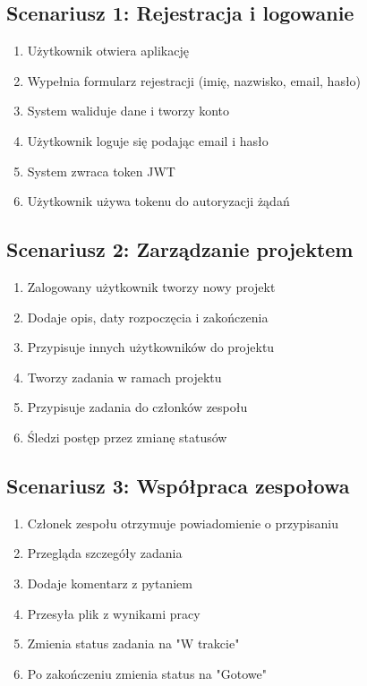 \documentclass[12pt,a4paper]{report}
\begin{document}
\subsection{Scenariusz 1: Rejestracja i logowanie}

\begin{enumerate}
    \item Użytkownik otwiera aplikację
    \item Wypełnia formularz rejestracji (imię, nazwisko, email, hasło)
    \item System waliduje dane i tworzy konto
    \item Użytkownik loguje się podając email i hasło
    \item System zwraca token JWT
    \item Użytkownik używa tokenu do autoryzacji żądań
\end{enumerate}

\subsection{Scenariusz 2: Zarządzanie projektem}

\begin{enumerate}
    \item Zalogowany użytkownik tworzy nowy projekt
    \item Dodaje opis, daty rozpoczęcia i zakończenia
    \item Przypisuje innych użytkowników do projektu
    \item Tworzy zadania w ramach projektu
    \item Przypisuje zadania do członków zespołu
    \item Śledzi postęp przez zmianę statusów
\end{enumerate}

\subsection{Scenariusz 3: Współpraca zespołowa}

\begin{enumerate}
    \item Członek zespołu otrzymuje powiadomienie o przypisaniu
    \item Przegląda szczegóły zadania
    \item Dodaje komentarz z pytaniem
    \item Przesyła plik z wynikami pracy
    \item Zmienia status zadania na "W trakcie"
    \item Po zakończeniu zmienia status na "Gotowe"
\end{enumerate}
\end{document}
